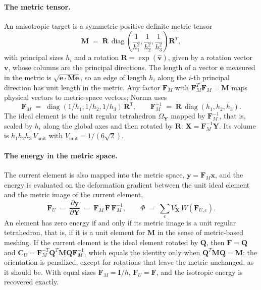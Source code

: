 \documentclass[11pt]{article}
\newcommand{\bs}[1]{\boldsymbol{#1}}
\begin{document}
\paragraph{The metric tensor.} An anisotropic target is a symmetric
positive definite metric tensor
\begin{equation}
  \bs M \;=\; \bs R\,\operatorname{diag}\!\left(\frac{1}{h_1^2},
  \frac{1}{h_2^2}, \frac{1}{h_3^2}\right) \bs R^T,
  \label{eq:metric}
\end{equation}
with principal sizes $h_i$ and a rotation $\bs R = \exp(\widehat{\bs v})$,
given by a rotation vector $\bs v$, whose columns are the principal
directions. The length of a vector $\bs e$ measured in the metric is
$\sqrt{\bs e \cdot \bs M \bs e}$, so an edge of length $h_i$ along the
$i$-th principal direction has unit length in the metric. Any factor
$\bs F_M$ with $\bs F_M^T \bs F_M = \bs M$ maps physical vectors to
metric-space vectors; Norma uses
\begin{equation}
  \bs F_M \;=\; \operatorname{diag}(1/h_1, 1/h_2, 1/h_3)\, \bs R^T,
  \qquad
  \bs F_M^{-1} \;=\; \bs R\, \operatorname{diag}(h_1, h_2, h_3).
  \label{eq:factor}
\end{equation}
The ideal element is the unit regular tetrahedron $\Omega_{\bs Y}$ mapped by
$\bs F_M^{-1}$, that is, scaled by $h_i$ along the global axes and then
rotated by $\bs R$: $\bs X = \bs F_M^{-1} \bs Y$. Its volume is
$h_1 h_2 h_3\, V_{\mathrm{unit}}$ with $V_{\mathrm{unit}} = 1/(6\sqrt 2)$.

\paragraph{The energy in the metric space.} The current element is also
mapped into the metric space, $\bs y = \bs F_M \bs x$, and the energy is
evaluated on the deformation gradient between the unit ideal element and
the metric image of the current element,
\begin{equation}
  \bs F_U \;=\; \frac{\partial \bs y}{\partial \bs Y}
  \;=\; \bs F_M\, \bs F\, \bs F_M^{-1},
  \qquad
  \Phi \;=\; \sum_e V^e_{\bs X}\, W(\bs F_{U,e}).
  \label{eq:FU}
\end{equation}
An element has zero energy if and only if its metric image is a unit
regular tetrahedron, that is, if it is a unit element for $\bs M$ in the
sense of metric-based meshing. If the current element is the ideal element
rotated by $\bs Q$, then $\bs F = \bs Q$ and
$\bs C_U = \bs F_M^{-T} \bs Q^T \bs M \bs Q \bs F_M^{-1}$, which equals the
identity only when $\bs Q^T \bs M \bs Q = \bs M$: the orientation is
penalized, except for rotations that leave the metric unchanged, as it
should be. With equal sizes $\bs F_M = \bs I / h$, $\bs F_U = \bs F$, and
the isotropic energy is recovered exactly.
\end{document}
